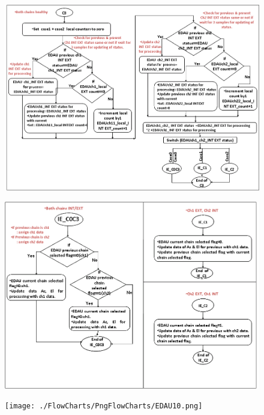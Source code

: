 \begin{figure}[H]
	\centering
	\includegraphics[width=\linewidth]{./FlowCharts/PngFlowCharts/EDAU8.png}
\end{figure}


\begin{figure}[H]
	\centering
	\includegraphics[width=\linewidth]{./FlowCharts/PngFlowCharts/EDAU9.png}
\end{figure}


\begin{figure}[H]
	\centering
	\texttt{[image: ./FlowCharts/PngFlowCharts/EDAU10.png]}
\end{figure}


